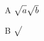 \documentclass{article}
\begin{document}
A $\sqrt{\mathstrut a}\sqrt{\mathstrut b}$

B $\sqrt{\mathstrut}$
\end{document}
